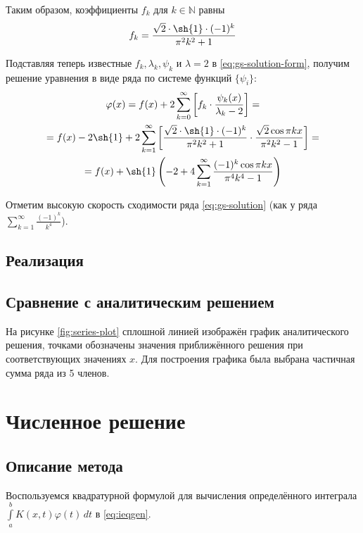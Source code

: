 \documentclass[11pt]{article}
\numberwithin{equation}{section}
\renewcommand{\phi}{\varphi}
\newcommand{\intl}{\int\limits}
\providecommand{\set}[1]{\mathbb{#1}}
\begin{document}
Таким образом, коэффициенты $f_k$ для $k \in \set{N}$ равны
\begin{equation}
  f_k = \frac{\sqrt{2} \cdot \sh{1}\cdot (-1)^k}{\pi^2 k^2 + 1}
\end{equation}

Подставляя теперь известные $f_k, \lambda_k, \psi_k$ и $\lambda = 2$ в
\eqref{eq:gs-solution-form}, получим решение уравнения в виде ряда по
системе функций $\{\psi_i\}$:
\begin{multline}
  \label{eq:gs-solution}
  \phi(x) = f(x) + 2 \sum_{k=0}^\infty \left [
    f_k\cdot\frac{\psi_k(x)}{\lambda_k-2} \right ] = \\
  = f(x) - 2 \sh{1} + 2 \sum_{k=1}^\infty\left [ \frac{\sqrt{2} \cdot
      \sh{1}\cdot (-1)^k}{\pi^2 k^2 + 1} \cdot \frac{\sqrt{2}\cos{\pi
        k x}}{\pi^2 k^2 - 1} \right ] = \\
  = f(x) + \sh{1} \left ( -2 + 4  \sum_{k=1}^\infty \frac{(-1)^k
      \cos{\pi k x}} {\pi^4 k^4 - 1} \right )
\end{multline}

Отметим высокую скорость сходимости ряда \eqref{eq:gs-solution} (как у
ряда $\sum \limits_{k=1}^\infty \frac{(-1)^k}{k^4}$).

\subsection{Реализация}
\label{sec:gs-implementation}



\clearpage
\subsection{Сравнение с аналитическим решением}

На рисунке \ref{fig:series-plot} сплошной линией изображён график
аналитического решения, точками обозначены значения приближённого
решения при соответствующих значениях $x$. Для построения графика была
выбрана частичная сумма ряда из 5 членов.




\clearpage
\section{Численное решение}
\label{sec:numerical}
\subsection{Описание метода}
Воспользуемся квадратурной формулой для вычисления определённого
интеграла $\intl_a^b {K(x, t) \phi(t)\,dt}$ в \eqref{eq:ieqgen}.
\end{document}

